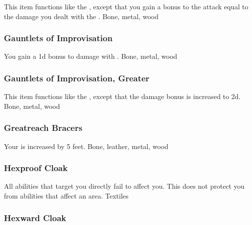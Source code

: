 This item functions like the , except that you gain a bonus to the  attack equal to the damage you dealt with the .
 
 Bone, metal, wood
\lowercase{\hypertarget{item:Gauntlets of Improvisation}{}}\label{item:Gauntlets of Improvisation}
\hypertarget{item:Gauntlets of Improvisation}{\subsubsection{Gauntlets of Improvisation\hfill{}}}
You gain a \plus1d bonus to damage with .
 
 Bone, metal, wood
\lowercase{\hypertarget{item:Gauntlets of Improvisation, Greater}{}}\label{item:Gauntlets of Improvisation, Greater}
\hypertarget{item:Gauntlets of Improvisation, Greater}{\subsubsection{Gauntlets of Improvisation, Greater\hfill{}}}
This item functions like the , except that the damage bonus is increased to \plus2d.
 
 Bone, metal, wood
\lowercase{\hypertarget{item:Greatreach Bracers}{}}\label{item:Greatreach Bracers}
\hypertarget{item:Greatreach Bracers}{\subsubsection{Greatreach Bracers\hfill{}}}
Your  is increased by 5 feet.
 
 Bone, leather, metal, wood
\lowercase{\hypertarget{item:Hexproof Cloak}{}}\label{item:Hexproof Cloak}
\hypertarget{item:Hexproof Cloak}{\subsubsection{Hexproof Cloak\hfill{}}}
All  abilities that target you directly fail to affect you.
This does not protect you from abilities that affect an area.
 
 Textiles
\lowercase{\hypertarget{item:Hexward Cloak}{}}\label{item:Hexward Cloak}
\hypertarget{item:Hexward Cloak}{\subsubsection{Hexward Cloak\hfill{}}}
